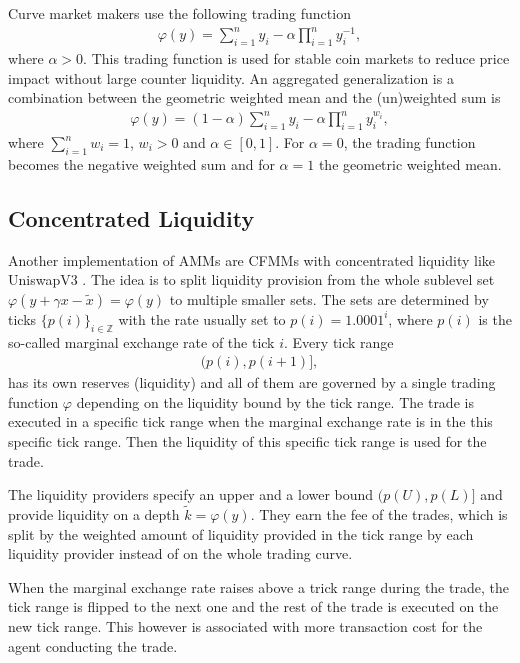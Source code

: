 Curve \cite{stableswap} market makers use the following trading function
\begin{align}
    \varphi(y) =\sum_{i=1}^{n}y_i  - \alpha \prod_{i=1}^{n} y_i^{-1} ,
\end{align}
where $\alpha > 0$. This trading function is used for stable coin markets to
reduce price impact without large counter liquidity. An aggregated
generalization is a combination between the geometric weighted mean and the
(un)weighted sum is
\begin{align}
    \varphi(y) =(1-\alpha)\sum_{i=1}^{n}y_i  - \alpha \prod_{i=1}^{n} y_i^{w_i},
\end{align}
where $\sum_{i=1}^{n}w_i  = 1$, $w_i > 0$ and $\alpha \in [0,1]$. For $\alpha
= 0$, the trading function becomes the negative weighted sum and for $\alpha
= 1$ the geometric weighted mean.

\subsection{Concentrated Liquidity}
Another implementation of AMMs are CFMMs with concentrated liquidity like
UniswapV3 \cite{uniswapv3_paper}. The idea is to split liquidity provision
from the whole sublevel set $\varphi(y +\gamma x-\tilde{x}) =\varphi(y)$ to
multiple smaller sets. The sets are determined by ticks $\{p(i)\}_{i \in
\mathbb{Z} }$ with the rate usually set to $p(i) = 1.0001^{i}$, where $p(i)$
is the so-called marginal exchange rate of the tick $i$. Every tick range
\begin{align}
    (p(i), p(i+1)],
\end{align}
has its own reserves (liquidity) and  all of them are governed by a single
trading function $\varphi$ depending on the liquidity bound by the tick
range. The trade is executed in a specific tick range when the marginal
exchange rate is in the this specific tick range. Then the liquidity of this
specific tick range is used for the trade.

The liquidity providers specify an upper and a lower bound $(p(U), p(L)]$ and
provide liquidity on a depth $\tilde{k} = \varphi(y)$. They earn the fee of
the trades, which is split by the weighted amount of liquidity provided in
the tick range by each liquidity provider instead of on the whole trading
curve.

When the marginal exchange rate raises above a trick range during the trade,
the tick range is flipped to the next one and the rest of the trade is
executed on the new tick range. This however is associated with more
transaction cost for the agent conducting the trade.


